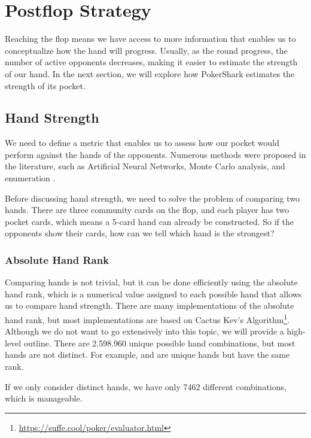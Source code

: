 \section{Postflop Strategy}
Reaching the flop means we have access to more information that enables us to conceptualize how the hand will progress. Usually, as the round progress, the number of active opponents decreases, making it easier to estimate the strength of our hand. In the next section, we will explore how PokerShark estimates the strength of its pocket.

\subsection{Hand Strength}
We need to define a metric that enables us to assess how our pocket would perform against the hands of the opponents. Numerous methods were proposed in the literature, such as Artificial Neural Networks\cite{bensson2013predicting}, Monte Carlo analysis, and enumeration \cite{billings_challenge_2002}.

Before discussing hand strength, we need to solve the problem of comparing two hands. There are three community cards on the flop, and each player has two pocket cards, which means a 5-card hand can already be constructed. So if the opponents show their cards, how can we tell which hand is the strongest?

\subsubsection{Absolute Hand Rank}
Comparing hands is not trivial, but it can be done efficiently using the absolute hand rank, which is a numerical value assigned to each possible hand that allows us to compare hand strength.
There are many implementations of the absolute hand rank, but most implementations are based on Cactus Kev's Algorithm\footnote{\url{https://suffe.cool/poker/evaluator.html}}. Although we do not want to go extensively into this topic, we will provide a high-level outline. There are 2.598.960 unique possible hand combinations, but most hands are not distinct. For example,  and   are unique hands but have the same rank.

If we only consider distinct hands, we have only 7462 different combinations, which is manageable.

